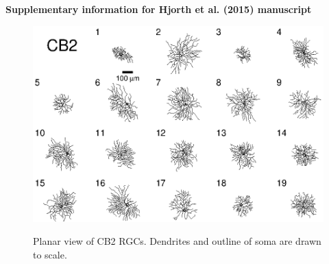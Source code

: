 \documentclass{article}
\begin{document}
\pagestyle{empty}


\vspace*{5cm}


\begin{center}
  { \Large 
    \textbf{Supplementary information for Hjorth et al. (2015) manuscript}}
\end{center}

\clearpage


\newcommand{\beginsupplement}{%
  \setcounter{table}{0}
  \renewcommand{\thetable}{S\arabic{table}}%
  \setcounter{figure}{0}
  \renewcommand{\thefigure}{S\arabic{figure}}%
}

\beginsupplement

%
%


\begin{figure}[h]
  \centering
  {\includegraphics[scale=1.5]{Figures/SupFig1/CB2-all-cells-1.eps}}
  \caption{Planar view of CB2 RGCs. Dendrites and outline of soma are
    drawn to scale. 
    \label{CB2planar}}
\end{figure}
\end{document}
